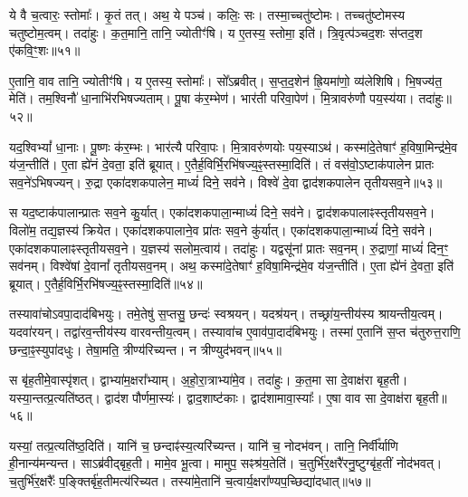ये वै च॒त्वारः॒ स्तोमाः᳚।
कृ॒तं तत्।
अथ॒ ये पञ्च॑।
कलिः॒ सः।
तस्मा॒च्चतु॑ष्टोमः।
तच्चतु॑ष्टोमस्य चतुष्टोम॒त्वम्।
तदा॑हुः।
क॒त॒मानि॒ तानि॒ ज्योतीꣳ॑षि।
य ए॒तस्य॒ स्तोमा॒ इति॑।
त्रि॒वृत्प॑ञ्चद॒शः स॑प्तद॒श ए॑कवि॒ꣳ॒शः॥५१॥\ip

ए॒तानि॒ वाव तानि॒ ज्योतीꣳ॑षि।
य ए॒तस्य॒ स्तोमाः᳚।
सो᳚ऽब्रवीत्।
स॒प्त॒द॒शेन॑ ह्रि॒यमा॑णो॒ व्य॑लेशिषि।
भि॒षज्य॑त॒ मेति॑।
तम॒श्विनौ॑ धा॒नाभि॑रभिषज्यताम्।
पू॒षा क॑र॒म्भेण॑।
भार॑ती परिवा॒पेण॑।
मि॒त्रावरु॑णौ पय॒स्य॑या।
तदा॑हुः॥५२॥\ip

यद॒श्विभ्यां᳚ धा॒नाः।
पू॒ष्णः क॑र॒म्भः।
भार॑त्यै परिवा॒पः।
मि॒त्रावरु॑णयोः पय॒स्याऽथ॑।
कस्मा॑दे॒तेषाꣳ॑ ह॒विषा॒मिन्द्र॑मे॒व य॑ज॒न्तीति॑।
ए॒ता ह्ये॑नं दे॒वता॒ इति॑ ब्रूयात्।
ए॒तैर्\mbox{}ह॒विर्भि॒\-रभि॑षज्य॒ꣴ॒स्तस्मा॒दिति॑।
तं वस॑वो॒\-ऽष्टा\-क॑पालेन प्रातः सव॒ने॑\-ऽभिषज्यन्।
रु॒द्रा एका॑\-दश\-कपालेन॒ माध्यं॑ दिने॒ सव॑ने।
विश्वे॑ दे॒वा द्वाद॑शकपालेन तृतीयसव॒ने॥५३॥\ip

स यद॒ष्टा\-क॑पालान्प्रातः सव॒ने कु॒र्यात्।
एका॑दश\-कपाला॒न्माध्यं॑ दिने॒ सव॑ने।
द्वाद॑श\-कपालाꣴस्तृतीयसव॒ने।
विलो॑म॒ तद्य॒ज्ञस्य॑ क्रियेत।
एका॑दश\-कपालाने॒व प्रा॑तः सव॒ने कु॑र्यात्।
एका॑दश\-कपाला॒न्माध्यं॑ दिने॒ सव॑ने।
एका॑दश\-कपालाꣴ\-स्तृतीयसव॒ने।
य॒ज्ञस्य॑ सलोम॒त्वाय॑।
तदा॑हुः।
यद्वसू॑नां प्रातः सव॒नम्।
रु॒द्राणां॒ माध्यं॑ दिन॒ꣳ॒ सव॑नम्।
विश्वे॑षां दे॒वानां᳚ तृतीयसव॒नम्।
अथ॒ कस्मा॑दे॒तेषाꣳ॑ ह॒विषा॒मिन्द्र॑मे॒व य॑ज॒न्तीति॑।
ए॒ता ह्ये॑नं दे॒वता॒ इति॑ ब्रूयात्।
ए॒तैर्\-\mbox{}ह॒विर्भि॒रभि॑\-षज्य॒ꣴ॒स्तस्मा॒दिति॑॥५४॥\ip\anuvakamend[ए॒क॒वि॒ꣳ॒श आ॑हुस्तृतीयसव॒ने प्रा॑तः सव॒नं पञ्च॑ च]

तस्यावा॑चो\-ऽवपा॒दाद॑बिभयुः।
तमे॒तेषु॑ स॒प्तसु॒ छन्दः॑ स्वश्रयन्।
यदश्र॑यन्।
तच्छ्रा॑य॒न्तीय॑स्य श्रायन्तीय॒त्वम्।
यदवा॑रयन्।
तद्वा॑र\-व॒न्तीय॑स्य वारवन्तीय॒त्वम्।
तस्यावा॑च ए॒वाव॑पा॒दाद॑बिभयुः।
तस्मा॑ ए॒तानि॑ स॒प्त च॑तुरुत्त॒राणि॒ छन्दा॒ꣴ॒स्युपा॑दधुः।
तेषा॒मति॒ त्रीण्य॑रिच्यन्त।
न त्रीण्युद॑\-भवन्॥५५॥\ip

स बृ॑ह॒तीमे॒वास्पृ॑शत्।
द्वाभ्या॑म॒क्षरा᳚भ्याम्।
अ॒हो॒रा॒त्राभ्या॑मे॒व।
तदा॑हुः।
क॒त॒मा सा दे॒वाक्ष॑रा बृह॒ती।
यस्या॒न्तत्प्र॒त्यति॑ष्ठत्।
द्वाद॑श पौर्णमा॒स्यः॑।
द्वाद॒शाष्ट॑काः।
द्वाद॑शामावा॒स्याः᳚।
ए॒षा वाव सा दे॒वाक्ष॑रा बृह॒ती॥५६॥\ip

यस्यां॒ तत्प्र॒त्यति॑ष्ठ॒दिति॑।
यानि॑ च॒ छन्दाꣴ॑स्य॒त्यरि॑च्यन्त।
यानि॑ च॒ नोदभ॑वन्।
तानि॒ निर्वी᳚र्याणि ही॒नान्य॑मन्यन्त।
साऽब्र॑वीद्बृह॒ती।
मामे॒व भू॒त्वा।
मामुप॒ सꣴश्र॑य॒तेति॑।
च॒तुर्भि॑र॒क्षरै॑रनु॒\-ष्टुग्बृ॑ह॒तीं नोद॑भवत्।
च॒तुर्भि॑र॒क्षरैः᳚ प॒ङ्क्तिर्बृ॑ह॒ती\-मत्य॑रिच्यत।
तस्या॑मे॒तानि॑ च॒त्वार्य॒क्षरा᳚ण्यप॒च्छिद्या॑\-दधात्॥५७॥\ip

